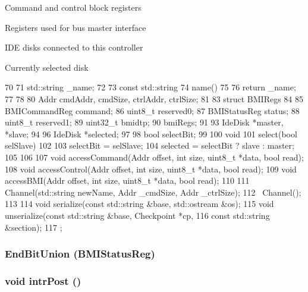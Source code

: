 Command and control block registers

Registers used for bus master interface

IDE disks connected to this controller

Currently selected disk 


\begin{DoxyCode}
70     {
71         std::string _name;
72 
73         const std::string
74         name()
75         {
76             return _name;
77         }
78 
80         Addr cmdAddr, cmdSize, ctrlAddr, ctrlSize;
81 
83         struct BMIRegs
84         {
85             BMICommandReg command;
86             uint8_t reserved0;
87             BMIStatusReg status;
88             uint8_t reserved1;
89             uint32_t bmidtp;
90         } bmiRegs;
91 
93         IdeDisk *master, *slave;
94 
96         IdeDisk *selected;
97 
98         bool selectBit;
99 
100         void
101         select(bool selSlave)
102         {
103             selectBit = selSlave;
104             selected = selectBit ? slave : master;
105         }
106 
107         void accessCommand(Addr offset, int size, uint8_t *data, bool read);
108         void accessControl(Addr offset, int size, uint8_t *data, bool read);
109         void accessBMI(Addr offset, int size, uint8_t *data, bool read);
110 
111         Channel(std::string newName, Addr _cmdSize, Addr _ctrlSize);
112         ~Channel();
113 
114         void serialize(const std::string &base, std::ostream &os);
115         void unserialize(const std::string &base, Checkpoint *cp,
116             const std::string &section);
117     };
\end{DoxyCode}
\hypertarget{classIdeController_af3c5b204b2ea4a04c542ab8f915dae04}{
\subsubsection[{EndBitUnion}]{\setlength{\rightskip}{0pt plus 5cm}EndBitUnion (BMIStatusReg)}}
\label{classIdeController_af3c5b204b2ea4a04c542ab8f915dae04}
\hypertarget{classIdeController_aba6fa755ca152cedafeb4150da6a2493}{
\subsubsection[{intrPost}]{\setlength{\rightskip}{0pt plus 5cm}void intrPost ()}}
\label{classIdeController_aba6fa755ca152cedafeb4150da6a2493}


